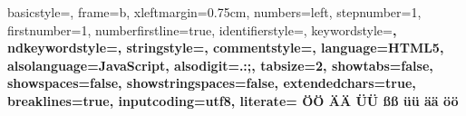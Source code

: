  {%
  basicstyle={\footnotesize\ttfamily},   
  frame=b,
  xleftmargin={0.75cm},
  numbers=left,
  stepnumber=1,
  firstnumber=1,
  numberfirstline=true,	
  identifierstyle=\color{black},
  keywordstyle=\color{blue}\bfseries,
  ndkeywordstyle=\color{editorGreen}\bfseries,
  stringstyle=\color{editorOcher}\ttfamily,
  commentstyle=\color{brown}\ttfamily,
  language=HTML5,
  alsolanguage=JavaScript,
  alsodigit={.:;},	
  tabsize=2,
  showtabs=false,
  showspaces=false,
  showstringspaces=false,
  extendedchars=true,
  breaklines=true,
  inputcoding=utf8,
  literate=%
  {Ö}{{\"O}}
  {Ä}{{\"A}}
  {Ü}{{\"U}}
  {ß}{{\ss}}
  {ü}{{\"u}}
  {ä}{{\"a}}
  {ö}{{\"o}}
}